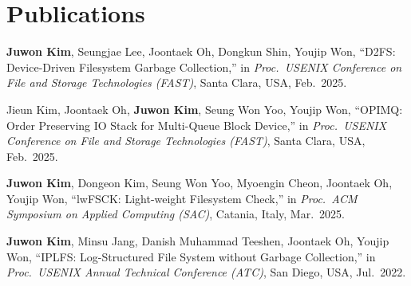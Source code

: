 \documentclass[11pt,a4paper]{article}
\begin{document}
\section{Publications}
\begin{enumerate}[leftmargin=1.6em, label={[\arabic*]}, nosep, itemsep=5pt]

\item \textbf{Juwon Kim}, Seungjae Lee, Joontaek Oh, Dongkun Shin, Youjip Won,
      ``D2FS: Device-Driven Filesystem Garbage Collection,''
      in \textit{Proc.\ USENIX Conference on File and Storage Technologies (FAST)},
      Santa Clara, USA, Feb.\ 2025.

\item Jieun Kim, Joontaek Oh, \textbf{Juwon Kim}, Seung Won Yoo, Youjip Won,
      ``OPIMQ: Order Preserving IO Stack for Multi-Queue Block Device,''
      in \textit{Proc.\ USENIX Conference on File and Storage Technologies (FAST)},
      Santa Clara, USA, Feb.\ 2025.

\item \textbf{Juwon Kim}, Dongeon Kim, Seung Won Yoo, Myoengin Cheon, Joontaek Oh, Youjip Won,
      ``lwFSCK: Light-weight Filesystem Check,''
      in \textit{Proc.\ ACM Symposium on Applied Computing (SAC)},
      Catania, Italy, Mar.\ 2025.

\item \textbf{Juwon Kim}, Minsu Jang, Danish Muhammad Teeshen, Joontaek Oh, Youjip Won,
      ``IPLFS: Log-Structured File System without Garbage Collection,''
      in \textit{Proc.\ USENIX Annual Technical Conference (ATC)},
      San Diego, USA, Jul.\ 2022.

\end{enumerate}


\end{document}
